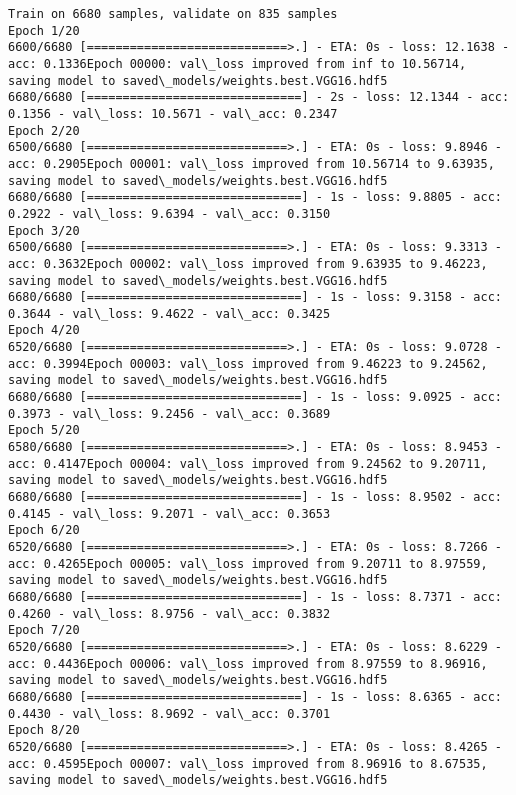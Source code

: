 \documentclass[11pt]{article}
\begin{document}
    \begin{Verbatim}[commandchars=\\\{\}]
Train on 6680 samples, validate on 835 samples
Epoch 1/20
6600/6680 [============================>.] - ETA: 0s - loss: 12.1638 - acc: 0.1336Epoch 00000: val\_loss improved from inf to 10.56714, saving model to saved\_models/weights.best.VGG16.hdf5
6680/6680 [==============================] - 2s - loss: 12.1344 - acc: 0.1356 - val\_loss: 10.5671 - val\_acc: 0.2347
Epoch 2/20
6500/6680 [============================>.] - ETA: 0s - loss: 9.8946 - acc: 0.2905Epoch 00001: val\_loss improved from 10.56714 to 9.63935, saving model to saved\_models/weights.best.VGG16.hdf5
6680/6680 [==============================] - 1s - loss: 9.8805 - acc: 0.2922 - val\_loss: 9.6394 - val\_acc: 0.3150
Epoch 3/20
6500/6680 [============================>.] - ETA: 0s - loss: 9.3313 - acc: 0.3632Epoch 00002: val\_loss improved from 9.63935 to 9.46223, saving model to saved\_models/weights.best.VGG16.hdf5
6680/6680 [==============================] - 1s - loss: 9.3158 - acc: 0.3644 - val\_loss: 9.4622 - val\_acc: 0.3425
Epoch 4/20
6520/6680 [============================>.] - ETA: 0s - loss: 9.0728 - acc: 0.3994Epoch 00003: val\_loss improved from 9.46223 to 9.24562, saving model to saved\_models/weights.best.VGG16.hdf5
6680/6680 [==============================] - 1s - loss: 9.0925 - acc: 0.3973 - val\_loss: 9.2456 - val\_acc: 0.3689
Epoch 5/20
6580/6680 [============================>.] - ETA: 0s - loss: 8.9453 - acc: 0.4147Epoch 00004: val\_loss improved from 9.24562 to 9.20711, saving model to saved\_models/weights.best.VGG16.hdf5
6680/6680 [==============================] - 1s - loss: 8.9502 - acc: 0.4145 - val\_loss: 9.2071 - val\_acc: 0.3653
Epoch 6/20
6520/6680 [============================>.] - ETA: 0s - loss: 8.7266 - acc: 0.4265Epoch 00005: val\_loss improved from 9.20711 to 8.97559, saving model to saved\_models/weights.best.VGG16.hdf5
6680/6680 [==============================] - 1s - loss: 8.7371 - acc: 0.4260 - val\_loss: 8.9756 - val\_acc: 0.3832
Epoch 7/20
6520/6680 [============================>.] - ETA: 0s - loss: 8.6229 - acc: 0.4436Epoch 00006: val\_loss improved from 8.97559 to 8.96916, saving model to saved\_models/weights.best.VGG16.hdf5
6680/6680 [==============================] - 1s - loss: 8.6365 - acc: 0.4430 - val\_loss: 8.9692 - val\_acc: 0.3701
Epoch 8/20
6520/6680 [============================>.] - ETA: 0s - loss: 8.4265 - acc: 0.4595Epoch 00007: val\_loss improved from 8.96916 to 8.67535, saving model to saved\_models/weights.best.VGG16.hdf5

\end{Verbatim}
\end{document}
